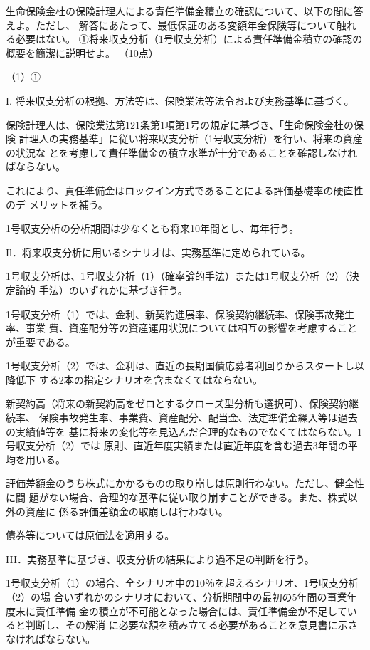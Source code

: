 \documentclass[report,gutter=10mm,fore-edge=10mm,uplatex,dvipdfmx]{jlreq}
\begin{document}
生命保険金杜の保険計理人による責任準備金積立の確認について、以下の間に答えよ。ただし、
解答にあたって、最低保証のある変額年金保険等について触れる必要はない。
①将来収支分析（1号収支分析）による責任準備金積立の確認の概要を簡潔に説明せよ。
（10点）

\answer{}
（1）①

I. 将来収支分析の根拠、方法等は、保険業法等法令および実務基準に基づく。

保険計理人は、保険業法第121条第1項第1号の規定に基づき、「生命保険金杜の保険
計理人の実務基準」に従い将来収支分析（1号収支分析）を行い、将来の資産の状況な
とを考慮して責任準備金の積立水準が十分であることを確認しなければならない。

これにより、責任準備金はロックイン方式であることによる評価基礎率の硬直性のデ
メリットを補う。

1号収支分析の分析期間は少なくとも将来10年間とし、毎年行う。

Il．将来収支分析に用いるシナリオは、実務基準に定められている。

1号収支分析は、1号収支分析（1）（確率論的手法）または1号収支分析（2）（決定論的
手法）のいずれかに基づき行う。

1号収支分析（1）では、金利、新契約進展率、保険契約継続率、保険事故発生率、事業
費、資産配分等の資産運用状況については相互の影響を考慮することが重要である。

1号収支分析（2）では、金利は、直近の長期国債応募者利回りからスタートし以降低下
する2本の指定シナリオを含まなくてはならない。

新契約高（将来の新契約高をゼロとするクローズ型分析も選択可）、保険契約継続率、
保険事故発生率、事業費、資産配分、配当金、法定準備金繰入等は過去の実績値等を
基に将来の変化等を見込んだ合理的なものでなくてはならない。1号収支分析（2）では
原則、直近年度実績または直近年度を含む過去3年間の平均を用いる。

評価差額金のうち株式にかかるものの取り崩しは原則行わない。ただし、健全性に間
題がない場合、合理的な基準に従い取り崩すことができる。また、株式以外の資産に
係る評価差額金の取崩しは行わない。

債券等については原価法を適用する。

III．実務基準に基づき、収支分析の結果により過不足の判断を行う。

1号収支分析（1）の場合、全シナリオ中の10％を超えるシナリオ、1号収支分析（2）の場
合いずれかのシナリオにおいて、分析期間中の最初の5年間の事業年度末に責任準備
金の積立が不可能となった場合には、責任準備金が不足していると判断し、その解消
に必要な額を積み立てる必要があることを意見書に示さなければならない。
\end{document}
